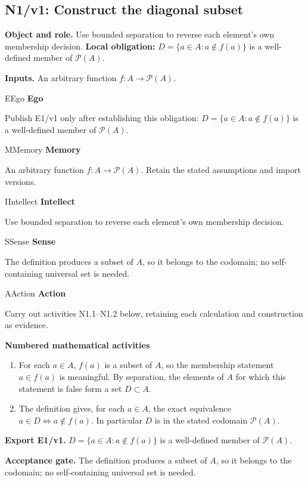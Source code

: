\documentclass[preprint,12pt,aps,pra,showkeys,amsmath,amssymb,superscriptaddress,floatfix]{revtex4-2}
\theoremstyle{definition}
\theoremstyle{remark}
\newcommand{\mmfaculty}[3]{%
 \begin{mmfacultybox}{#1}{#2}
 {\sffamily\bfseries\color{MMBlue}#2}\par\smallskip #3
 \end{mmfacultybox}}
\newcommand{\field}[2]{\par\smallskip\noindent\textbf{#1.} #2\par}
\begin{document}
\subsection{N1/v1: Construct the diagonal subset}

\field{Object and role}{Use bounded separation to reverse each element's own membership
decision. \textbf{Local obligation:} \(D=\{a\in A:a\notin f(a)\}\) is a
well-defined member of \(\mathcal P(A)\).}

\field{Inputs}{An arbitrary function \(f:A\to\mathcal P(A)\).}

\mmfaculty{E}{Ego}{Publish E1/v1 only after establishing this obligation:
\(D=\{a\in A:a\notin f(a)\}\) is a well-defined member of
\(\mathcal P(A)\).}

\mmfaculty{M}{Memory}{An arbitrary function \(f:A\to\mathcal P(A)\). Retain the stated
assumptions and import versions.}

\mmfaculty{I}{Intellect}{Use bounded separation to reverse each element's own membership
decision.}

\mmfaculty{S}{Sense}{The definition produces a subset of \(A\), so it belongs to the
codomain; no self-containing universal set is needed.}

\mmfaculty{A}{Action}{Carry out activities N1.1--N1.2 below, retaining each calculation and
construction as evidence.}

\smallskip\noindent\textbf{Numbered mathematical activities}

\begin{enumerate}[label=N1.\arabic*,leftmargin=3.4em]

\item For each \(a\in A\), \(f(a)\) is a subset of \(A\), so the membership
statement \(a\in f(a)\) is meaningful. By separation, the elements of
\(A\) for which this statement is false form a set \(D\subset A\).

\item The definition gives, for each \(a\in A\), the exact equivalence
\(a\in D\iff a\notin f(a)\). In particular \(D\) is in the stated
codomain \(\mathcal P(A)\).

\end{enumerate}

\field{Export E1/v1}{\(D=\{a\in A:a\notin f(a)\}\) is a well-defined member of
\(\mathcal P(A)\).}

\field{Acceptance gate}{The definition produces a subset of \(A\), so it belongs to the
codomain; no self-containing universal set is needed.}
\end{document}
